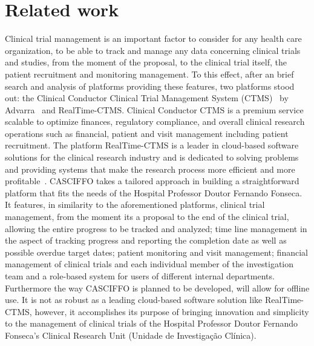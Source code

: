 \section{Related work}
Clinical trial management is an important factor to consider for any health care organization, to be able to track and manage any data concerning clinical trials and studies, from the moment of the proposal, to the clinical trial itself, the patient recruitment and monitoring management. To this effect, after an brief search and analysis of platforms providing these features, two platforms stood out: the Clinical Conductor Clinical Trial Management System (CTMS)~\cite{clinical-conductor-ctms} by Advarra~\cite{Advarra} and RealTime-CTMS. Clinical Conductor CTMS is a premium service scalable to optimize finances, regulatory compliance, and overall clinical research operations such as financial, patient and visit management including patient recruitment. The platform RealTime-CTMS is a leader in cloud-based software solutions for the clinical research industry and is dedicated to solving problems and providing systems that make the research process more efficient and more profitable~\cite{realtime-ctms}.
CASCIFFO takes a tailored approach in building a straightforward platform that fits the needs of the Hospital Professor Doutor Fernando Fonseca. It features, in similarity to the aforementioned platforms, clinical trial management, from the moment its a proposal to the end of the clinical trial, allowing the entire progress to be tracked and analyzed; time line management in the aspect of tracking progress and reporting the completion date as well as possible overdue target dates; patient monitoring and visit management; financial management of clinical trials and each individual member of the investigation team and a role-based system for users of different internal departments. Furthermore the way CASCIFFO is planned to be developed, will allow for offline use. It is not as robust as a leading cloud-based software solution like RealTime-CTMS, however, it accomplishes its purpose of bringing innovation and simplicity to the management of clinical trials of the Hospital Professor Doutor Fernando Fonseca's Clinical Research Unit (Unidade de Investigação Clínica).

